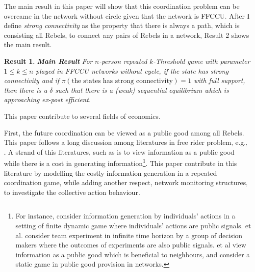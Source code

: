 \documentclass[12pt,letter]{article}
\newtheorem{result}{Result}
\theoremstyle{definition}
\theoremstyle{remark}
\theoremstyle{claim}
\begin{document}
The main result in this paper will show that this coordination problem can be overcame in the network without circle given that the network is FFCCU. After I define \textit{strong connectivity} as the property that there is always a path, which is consisting all Rebels, to connect any pairs of Rebels in a network,  Result 2 shows the main result.

\begin{result}\textbf{Main Result}
For $n$-person repeated $k$-Threshold game with parameter $1\leq k \leq n$ played in FFCCU networks without cycle,
if the state has strong connectivity and if $\pi(\text{the states has strong connectivity})=1$ with full support, then there is a $\delta$ such that there is a (weak) sequential equilibrium which is approaching ex-post efficient.
\end{result}




This paper contribute to several fields of economics. 

First, the future coordination can be viewed as a public good among all Rebels. This paper follows a long discussion among literatures in free rider problem, e.g., \citep{OLSON1965}\citep{Granovetter1978}. A strand of this literatures, such as \citep{Lohmann1994} is to view information as a public good while there is a cost in generating information\footnote{For instance, \citep{Lohmann1993}\citep{Lohmann1994} consider information generation by individuals' actions in a setting of finite dynamic game where individuals' actions are public signals. \citep{Bolton1999} et al. consider team experiment in infinite time horizon by a group of decision makers where the outcomes of experiments are also public signals. \citep{Bramoulle2007} et al view information as a public good which is beneficial to neighbours, and consider a static game in public good provision in networks.}. This paper contribute in this literature by modelling the costly information generation in a repeated coordination game, while adding another respect, network monitoring structures, to investigate the collective action behaviour.
\end{document}
